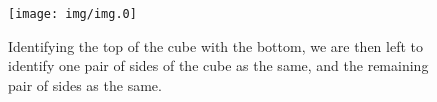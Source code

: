 \begin{figure}[th]
\texttt{[image: img/img.0]}
\caption{Identifying the top of the cube with the bottom, we are
  then left to identify one pair of sides of the cube as the
  same, and the remaining pair of sides as the same.}\label{fig:img0}
\end{figure}


